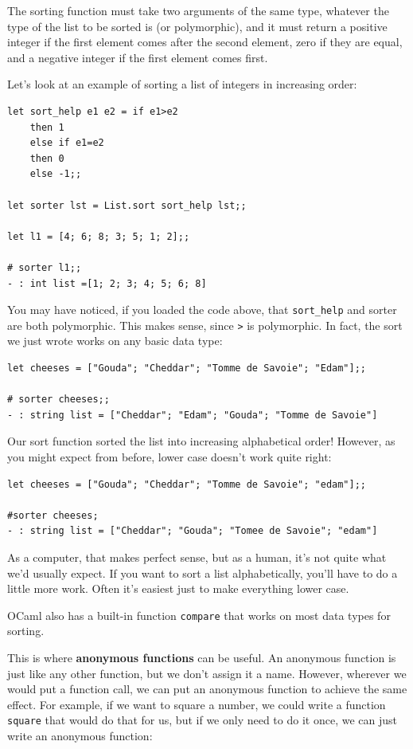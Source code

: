 \documentclass[10pt]{book}
\begin{document}
{The sorting function must take two arguments of the same type, whatever 
the type of the list to be sorted is (or polymorphic), and it must return
a positive integer if the first element comes after the second element, 
zero if they are equal, and a negative integer if the first element comes 
first.

Let's look at an example of sorting a list of integers in increasing order:

\beforeverb
\begin{verbatim}
let sort_help e1 e2 = if e1>e2
	then 1
	else if e1=e2
	then 0
	else -1;;

let sorter lst = List.sort sort_help lst;;

let l1 = [4; 6; 8; 3; 5; 1; 2];;

# sorter l1;;
- : int list =[1; 2; 3; 4; 5; 6; 8]
\end{verbatim}
\afterverb

You may have noticed, if you loaded the code above, that
\verb"sort_help" and sorter are both polymorphic. This makes sense, 
since {\tt >} is polymorphic. In fact, the sort we just wrote
works on any basic data type:

\beforeverb
\begin{verbatim}
let cheeses = ["Gouda"; "Cheddar"; "Tomme de Savoie"; "Edam"];;

# sorter cheeses;;
- : string list = ["Cheddar"; "Edam"; "Gouda"; "Tomme de Savoie"]
\end{verbatim}
\afterverb
Our sort function sorted the list into increasing alphabetical order!
However, as you might expect from before, lower case doesn't work quite 
right:

\beforeverb
\begin{verbatim}
let cheeses = ["Gouda"; "Cheddar"; "Tomme de Savoie"; "edam"];;

#sorter cheeses;
- : string list = ["Cheddar"; "Gouda"; "Tomee de Savoie"; "edam"]
\end{verbatim}
\afterverb
As a computer, that makes perfect sense, but as a human, it's not 
quite what we'd usually expect. If you want to sort a list alphabetically,
you'll have to do a little more work. Often it's easiest just to make 
everything lower case.

OCaml also has a built-in function {\tt compare} that works on most 
data types for sorting.

This is where {\bf anonymous functions} can be useful. An anonymous function
is just like any other function, but we don't assign it a name. However, 
wherever we would put a function call, we can put an anonymous function to 
achieve the same effect. For example, if we want to square a number, we could
write a function {\tt square} that would do that for us, but if we only need 
to do it once, we can just write an anonymous function:

}
\end{document}
